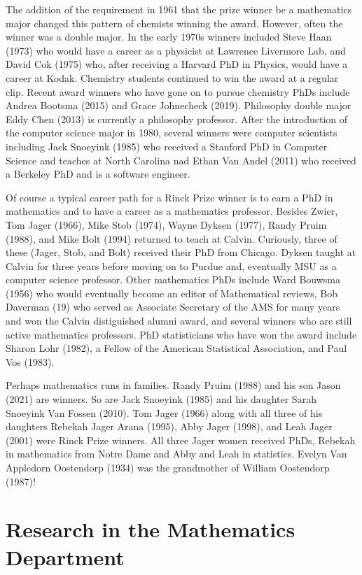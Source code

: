 \documentclass[
]{book}
\begin{document}
The addition of the requirement in 1961 that the prize winner be a mathematics major changed this pattern of chemists winning the award. However, often the winner was a double major. In the early 1970s winners included Steve Haan (1973) who would have a career as a physicist at Lawrence Livermore Lab, and David Cok (1975) who, after receiving a Harvard PhD in Physics, would have a career at Kodak. Chemistry students continued to win the award at a regular clip. Recent award winners who have gone on to pursue chemistry PhDs include Andrea Bootsma (2015) and Grace Johnecheck (2019). Philosophy double major Eddy Chen (2013) is currently a philosophy professor. After the introduction of the computer science major in 1980, several winners were computer scientists including Jack Snoeyink (1985) who received a Stanford PhD in Computer Science and teaches at North Carolina nad Ethan Van Andel (2011) who received a Berkeley PhD and is a software engineer.

Of course a typical career path for a Rinck Prize winner is to earn a PhD in mathematics and to have a career as a mathematics professor. Besides Zwier, Tom Jager (1966), Mike Stob (1974), Wayne Dyksen (1977), Randy Pruim (1988), and Mike Bolt (1994) returned to teach at Calvin. Curiously, three of these (Jager, Stob, and Bolt) received their PhD from Chicago. Dyksen taught at Calvin for three years before moving on to Purdue and, eventually MSU as a computer science professor. Other mathematics PhDs include Ward Bouwsma (1956) who would eventually become an editor of Mathematical reviews, Bob Daverman (19) who served as Associate Secretary of the AMS for many years and won the Calvin distiguished alumni award, and several winners who are still active mathematics professors. PhD statisticians who have won the award include Sharon Lohr (1982), a Fellow of the American Statistical Association, and Paul Vos (1983).

Perhaps mathematics runs in families. Randy Pruim (1988) and his son Jason (2021) are winners. So are Jack Snoeyink (1985) and his daughter Sarah Snoeyink Van Fossen (2010). Tom Jager (1966) along with all three of his daughters Rebekah Jager Arana (1995), Abby Jager (1998), and Leah Jager (2001) were Rinck Prize winners. All three Jager women received PhDs, Rebekah in mathematics from Notre Dame and Abby and Leah in statistics. Evelyn Van Appledorn Oostendorp (1934) was the grandmother of William Oostendorp (1987)!

\hypertarget{research-in-the-mathematics-department}{%
\chapter{Research in the Mathematics Department}\label{research-in-the-mathematics-department}}
\end{document}
